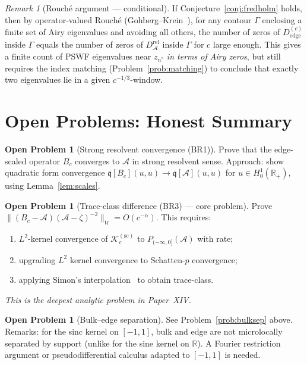\documentclass[12pt,a4paper]{amsart}
\theoremstyle{definition}
\newtheorem{problem}[theorem]{Open Problem}
\theoremstyle{remark}
\newtheorem{remark}[theorem]{Remark}
\newcommand{\Kc}{\mathcal{K}_c}
\newcommand{\cA}{\mathcal{A}}
\newcommand{\R}{\mathbb{R}}
\newcommand{\tr}{\mathrm{tr}}
\begin{document}
\begin{remark}[Rouch\'{e} argument --- conditional]
If Conjecture~\ref{conj:fredholm} holds,
then by operator-valued Rouch\'{e} (Gohberg--Krein~\cite{GohKre1969}),
for any contour $\Gamma$ enclosing a finite set of Airy eigenvalues
and avoiding all others,
the number of zeros of $D_{\mathrm{edge}}^{(c)}$ inside $\Gamma$
equals the number of zeros of $D_\cA^{\mathrm{rel}}$ inside $\Gamma$
for $c$ large enough.
This gives a finite count of PSWF eigenvalues near $z_{n^*}$
\emph{in terms of Airy zeros},
but still requires the index matching (Problem~\ref{prob:matching})
to conclude that exactly two eigenvalues lie in a given $c^{-1/3}$-window.
\end{remark}

\section{Open Problems: Honest Summary}
\label{sec:open}

\begin{problem}[Strong resolvent convergence (BR1)]
\label{prob:BR1}
Prove that the edge-scaled operator $B_c$ converges to $\cA$
in strong resolvent sense.
Approach: show quadratic form convergence
$\mathfrak{q}[B_c](u,u) \to \mathfrak{q}[\cA](u,u)$
for $u \in H^1_0(\R_+)$, using Lemma~\ref{lem:scales}.
\end{problem}

\begin{problem}[Trace-class difference (BR3) --- core problem]
\label{prob:bridge}
Prove $\|(B_c - \cA)(\cA-\zeta)^{-2}\|_{\tr} = O(c^{-\alpha})$.
This requires:
\begin{enumerate}[nosep,label=(\roman*)]
 \item $L^2$-kernel convergence of $\Kc^{(\mathrm{sc})}$ to $P_{(-\infty,0]}(\cA)$
 with rate;
 \item upgrading $L^2$ kernel convergence to Schatten-$p$ convergence;
 \item applying Simon's interpolation~\cite{Simon2005} to obtain trace-class.
\end{enumerate}
\emph{This is the deepest analytic problem in Paper~XIV.}
\end{problem}

\begin{problem}[Bulk--edge separation]
\label{prob:bulksep2}
See Problem~\ref{prob:bulksep} above.
Remarks: for the sinc kernel on $[-1,1]$,
bulk and edge are not microlocally separated by support
(unlike for the sine kernel on $\R$).
A Fourier restriction argument or pseudodifferential
calculus adapted to $[-1,1]$ is needed.
\end{problem}
\end{document}
